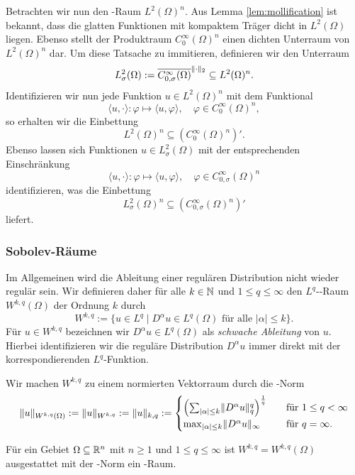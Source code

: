 Betrachten wir nun den \hilbert\hyp{}Raum $L^2(\Omega)^n$.
Aus Lemma \ref{lem:mollification} ist bekannt, dass die glatten Funktionen mit kompaktem Träger dicht in $L^2(\Omega)$ liegen. 
Ebenso stellt der Produktraum $C_0^\infty(\Omega)^n$ einen dichten Unterraum von $L^2(\Omega)^n$ dar.
Um diese Tatsache zu immitieren, definieren wir den Unterraum 
$$
  L^2_\sigma(\Omega) 
  := \overline{C_{0,\sigma}^\infty(\Omega)}^{\lVert \cdot \rVert_2}
  \subseteq L^2(\Omega)^n.
$$
Identifizieren wir nun jede Funktion $u \in L^2(\Omega)^n$ mit dem Funktional
$$
\langle u, \cdot \rangle \colon \varphi \mapsto \langle u, \varphi \rangle, \quad \varphi \in C_0^\infty(\Omega)^n,
$$
so erhalten wir die Einbettung 
$$
  L^2(\Omega)^n \subseteq (C_0^\infty(\Omega)^n)'.
$$
Ebenso lassen sich Funktionen $u \in L^2_\sigma(\Omega)$ mit der entsprechenden Einschränkung
$$
\langle u, \cdot \rangle \colon \varphi \mapsto \langle u, \varphi \rangle, \quad \varphi \in C_{0,\sigma}^\infty(\Omega)^n
$$
identifizieren, was die Einbettung
$$
  L^2_\sigma(\Omega)^n \subseteq (C_{0,\sigma}^\infty(\Omega)^n)'
$$
liefert.

\subsubsection{Sobolev-Räume}

Im Allgemeinen wird die Ableitung einer regulären Distribution nicht wieder regulär sein.
Wir definieren daher für alle $k \in \mathbb{N}$ und $1 \leq q \leq \infty$ den $L^q$\hyp{}\sobolev\hyp{}Raum $W^{k,q}(\Omega)$ der Ordnung $k$ durch
$$
W^{k,q} := \{ u \in L^q \mid D^\alpha u \in L^q(\Omega) \text{ für alle } |\alpha| \leq k\}.
$$
Für $u \in W^{k,q}$ bezeichnen wir $D^\alpha u \in L^q(\Omega)$ als \emph{schwache Ableitung} von $u$.
Hierbei identifizieren wir die reguläre Distribution $D^\alpha u$ immer direkt mit der korrespondierenden $L^q$\hyp{}Funktion.

Wir machen $W^{k,q}$ zu einem normierten Vektorraum durch die \sobolev\hyp{}Norm
$$
  \lVert u \rVert_{W^{k,q}(\Omega)} 
  := \lVert u \rVert_{W^{k,q}} 
  := \lVert u \rVert_{k,q} 
  := \begin{cases} 
    \left(\sum_{|\alpha| \leq k} \lVert D^\alpha u \rVert_q^q \right)^\frac{1}{q}\quad&\text{für } 1 \leq q < \infty \\
    \max_{|\alpha| \leq k} \lVert D^\alpha u \rVert_\infty \quad&\text{für }q = \infty.
    \end{cases}
$$

\begin{lem}
  Für ein Gebiet $\Omega \subseteq \mathbb{R}^n$ mit $n \geq 1$ und $1 \leq q \leq \infty$ ist $W^{k,q} = W^{k,q}(\Omega)$ ausgestattet mit der \sobolev\hyp{}Norm ein \banach\hyp{}Raum.
\end{lem}

